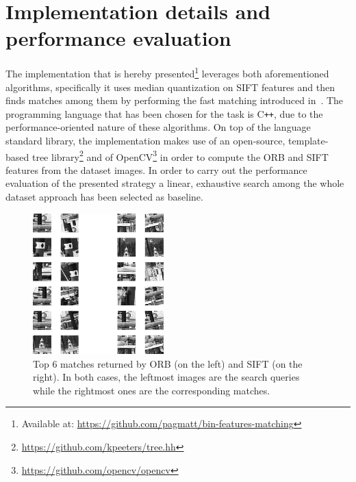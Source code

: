 \documentclass[a4paper, 11pt, oneside]{article}
\begin{document}
\section*{Implementation details and performance evaluation}
The implementation that is hereby presented\footnote{Available at: \url{https://github.com/pagmatt/bin-features-matching}} leverages both aforementioned algorithms, specifically it uses median quantization on SIFT features and then finds matches among them by performing the fast matching introduced in~\cite{muja2012fast}.
The programming language that has been chosen for the task is C\texttt{++}, due to the performance-oriented nature of these algorithms. On top of the language standard library, the implementation makes use of an open-source, template-based tree library\footnote{\url{https://github.com/kpeeters/tree.hh}} and of OpenCV\footnote{\url{https://github.com/opencv/opencv}} in order to compute the ORB and SIFT features from the dataset images.
In order to carry out the performance evaluation of the presented strategy a linear, exhaustive search among the whole dataset approach has been selected as baseline. 
\begin{figure}
  \vspace{-10pt}
  \begin{center}
    \includegraphics[width=0.45\textwidth]{figures/merged.png}
  \end{center}
  \caption{Top $6$ matches returned by ORB (on the left) and SIFT (on the right). In both cases, the leftmost images are the search queries while the rightmost ones are the corresponding matches.}
  \label{Fig:perf_acc}
\end{figure}
\end{document}
